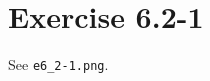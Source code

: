 \documentclass{article}
\begin{document}
\section*{Exercise 6.2-1}

See \texttt{e6\_2-1.png}.
\end{document}
